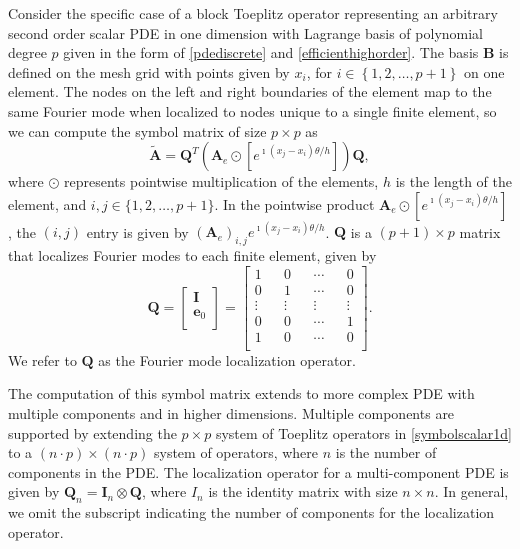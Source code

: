 \documentclass[review]{siamart190516}
\begin{document}
Consider the specific case of a block Toeplitz operator representing an arbitrary second order scalar PDE in one dimension with Lagrange basis of polynomial degree $p$ given in the form of \cref{pdediscrete} and \cref{efficienthighorder}.
The basis $\mathbf{B}$ is defined on the mesh grid with points given by $x_i$, for $i \in \left\lbrace 1, 2, \dots, p + 1 \right\rbrace$ on one element.
The nodes on the left and right boundaries of the element map to the same Fourier mode when localized to nodes unique to a single finite element, so we can compute the symbol matrix of size $p \times p$ as
\begin{equation}\label{symbolscalar1d}
\tilde{\mathbf{A}} = \mathbf{Q}^T \left( \mathbf{A}_e \odot \left[ e^{\imath \left( x_j - x_i \right) \theta / h} \right] \right) \mathbf{Q},
\end{equation}
where $\odot$ represents pointwise multiplication of the elements, $h$ is the length of the element, and $i, j \in \lbrace 1, 2, \dots, p + 1 \rbrace$.
In the pointwise product $\mathbf{A}_e \odot \left[ e^{\imath \left( x_j - x_i \right) \theta / h} \right]$, the $\left( i, j \right)$ entry is given by $\left( \mathbf{A}_e \right)_{i, j} e^{\imath \left( x_j - x_i \right) \theta / h}$.
$\mathbf{Q}$ is a $\left( p + 1 \right) \times p$ matrix that localizes Fourier modes to each finite element, given by
\begin{equation}
\mathbf{Q} =
\begin{bmatrix}
    \mathbf{I}   \\
    \mathbf{e}_0 \\
\end{bmatrix} =
\begin{bmatrix}
    1      && 0      && \cdots && 0      \\
    0      && 1      && \cdots && 0      \\
    \vdots && \vdots && \vdots && \vdots \\
    0      && 0      && \cdots && 1      \\
    1      && 0      && \cdots && 0      \\
\end{bmatrix}.
\end{equation}
We refer to $\mathbf{Q}$ as the Fourier mode localization operator.

The computation of this symbol matrix extends to more complex PDE with multiple components and in higher dimensions.
Multiple components are supported by extending the $p \times p$ system of Toeplitz operators in \cref{symbolscalar1d} to a $\left( n \cdot p \right) \times \left( n \cdot p \right)$ system of operators, where $n$ is the number of components in the PDE.
The localization operator for a multi-component PDE is given by $\mathbf{Q}_n = \mathbf{I}_n \otimes \mathbf{Q}$, where $I_n$ is the identity matrix with size $n \times n$.
In general, we omit the subscript indicating the number of components for the localization operator.
\end{document}
